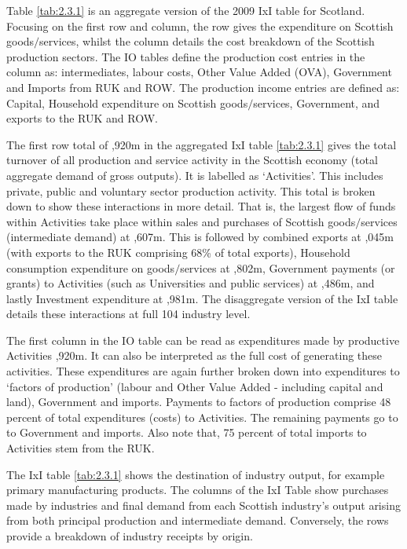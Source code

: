 \bigskip

Table \ref{tab:2.3.1} is an aggregate version of the 2009 IxI table for Scotland. Focusing on the first row and column, the row gives the expenditure on Scottish goods$/$services, whilst the column details the cost breakdown of the Scottish production sectors. The IO tables define the production cost entries in the column as: intermediates, labour costs, Other Value Added (OVA), Government and Imports from RUK and ROW. The production income entries are defined as: Capital, Household expenditure on Scottish goods$/$services, Government, and exports to the RUK and ROW.  

\bigskip

The first row total of ,920m in the aggregated IxI table \ref{tab:2.3.1} gives the total turnover of all production and service activity in the Scottish economy (total aggregate demand of gross outputs). It is labelled as `Activities'. This includes private, public and voluntary sector production activity. This total is broken down to show these interactions in more detail. That is, the largest flow of funds within Activities take place within sales and purchases of Scottish goods$/$services (intermediate demand) at ,607m. This is followed by combined exports at ,045m (with exports to the RUK comprising 68\% of total exports), Household consumption expenditure on goods$/$services at ,802m, Government payments (or grants) to Activities (such as Universities and public services) at ,486m, and lastly Investment expenditure at ,981m. The disaggregate version of the IxI table details these interactions at full 104 industry level.

\bigskip

The first column in the IO table can be read as expenditures made by productive Activities ,920m. It can also be interpreted as the full cost of generating these activities. These expenditures are again further broken down into expenditures to `factors of production' (labour and Other Value Added - including capital and land), Government and imports. Payments to factors of production comprise 48 percent of total expenditures (costs) to Activities. The remaining payments go to to Government and imports. Also note that, 75 percent of total imports to Activities stem from the RUK.

\bigskip

The IxI table \ref{tab:2.3.1} shows the destination of industry output, for example primary manufacturing products. The columns of the IxI Table show purchases made by industries and final demand from each Scottish industry's output arising from both principal production and intermediate demand. Conversely, the rows provide a breakdown of industry receipts by origin.

